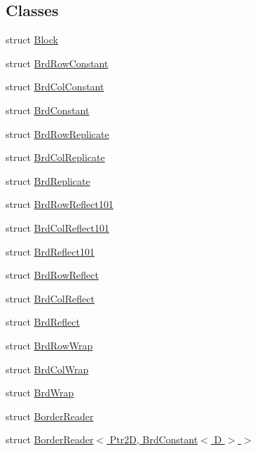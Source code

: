 \subsection*{Classes}
\begin{DoxyCompactItemize}
\item 
struct \hyperlink{structcv_1_1gpu_1_1device_1_1Block}{Block}
\item 
struct \hyperlink{structcv_1_1gpu_1_1device_1_1BrdRowConstant}{Brd\-Row\-Constant}
\item 
struct \hyperlink{structcv_1_1gpu_1_1device_1_1BrdColConstant}{Brd\-Col\-Constant}
\item 
struct \hyperlink{structcv_1_1gpu_1_1device_1_1BrdConstant}{Brd\-Constant}
\item 
struct \hyperlink{structcv_1_1gpu_1_1device_1_1BrdRowReplicate}{Brd\-Row\-Replicate}
\item 
struct \hyperlink{structcv_1_1gpu_1_1device_1_1BrdColReplicate}{Brd\-Col\-Replicate}
\item 
struct \hyperlink{structcv_1_1gpu_1_1device_1_1BrdReplicate}{Brd\-Replicate}
\item 
struct \hyperlink{structcv_1_1gpu_1_1device_1_1BrdRowReflect101}{Brd\-Row\-Reflect101}
\item 
struct \hyperlink{structcv_1_1gpu_1_1device_1_1BrdColReflect101}{Brd\-Col\-Reflect101}
\item 
struct \hyperlink{structcv_1_1gpu_1_1device_1_1BrdReflect101}{Brd\-Reflect101}
\item 
struct \hyperlink{structcv_1_1gpu_1_1device_1_1BrdRowReflect}{Brd\-Row\-Reflect}
\item 
struct \hyperlink{structcv_1_1gpu_1_1device_1_1BrdColReflect}{Brd\-Col\-Reflect}
\item 
struct \hyperlink{structcv_1_1gpu_1_1device_1_1BrdReflect}{Brd\-Reflect}
\item 
struct \hyperlink{structcv_1_1gpu_1_1device_1_1BrdRowWrap}{Brd\-Row\-Wrap}
\item 
struct \hyperlink{structcv_1_1gpu_1_1device_1_1BrdColWrap}{Brd\-Col\-Wrap}
\item 
struct \hyperlink{structcv_1_1gpu_1_1device_1_1BrdWrap}{Brd\-Wrap}
\item 
struct \hyperlink{structcv_1_1gpu_1_1device_1_1BorderReader}{Border\-Reader}
\item 
struct \hyperlink{structcv_1_1gpu_1_1device_1_1BorderReader_3_01Ptr2D_00_01BrdConstant_3_01D_01_4_01_4}{Border\-Reader$<$ Ptr2\-D, Brd\-Constant$<$ D $>$ $>$}
\item 

\end{DoxyCompactItemize}
